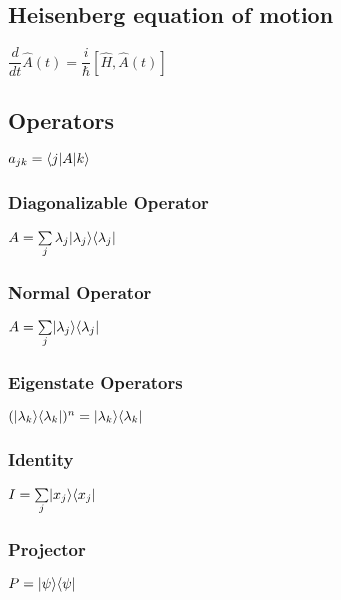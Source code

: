 \subsection{Heisenberg equation of motion}			
\begin{itemize}
\itemt \( \dfrac{d}{dt} \hat{A}(t) = \dfrac{i}{\hbar}[\hat{H},\hat{A}(t)] \)
\end{itemize}			

\subsection{Operators}			
\begin{itemize}
\itemt \( a_{jk} = \langle j\rvert A \lvert k\rangle \)
\end{itemize}			

\subsubsection{Diagonalizable Operator}			
\begin{itemize}
\itemt \( A = \sum\limits_{j} \lambda_j \lvert\lambda_j\rangle \langle\lambda_j\rvert \)
\end{itemize}

\subsubsection{Normal Operator}			
\begin{itemize}
\itemt \( A =\sum\limits_{j} \lvert\lambda_j\rangle \langle\lambda_j\rvert \)
\end{itemize}

\subsubsection{Eigenstate Operators}			
\begin{itemize}
\itemt \( (\lvert\lambda_k\rangle\langle\lambda_k\rvert)^n = \lvert\lambda_k\rangle\langle\lambda_k\rvert \)
\end{itemize}

\subsubsection{Identity}
\begin{itemize}
\itemt \( I = \sum\limits_{j} \lvert x_j\rangle \langle x_j\rvert \)
\end{itemize}

\subsubsection{Projector}
\begin{itemize}
\itemt \( P = \lvert\psi\rangle \langle\psi\rvert \)
\end{itemize}				

